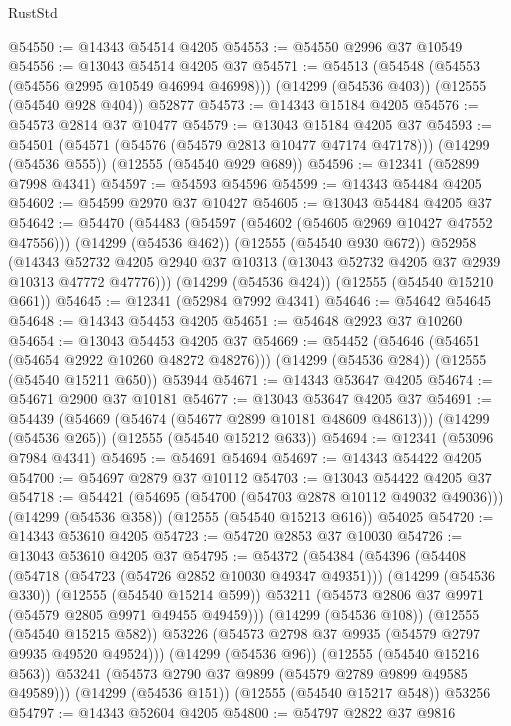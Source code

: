 \begin{lexlean}{RustStd}
\begin{coremodule}
@54550 := @14343 @54514 @4205
@54553 := @54550 @2996 @37 @10549
@54556 := @13043 @54514 @4205 @37
@54571 := @54513
    (@54548 (@54553 (@54556 @2995 @10549 @46994 @46998)))
    (@14299 (@54536 @403))
    (@12555 (@54540 @928 @404))
    @52877
@54573 := @14343 @15184 @4205
@54576 := @54573 @2814 @37 @10477
@54579 := @13043 @15184 @4205 @37
@54593 := @54501
    (@54571 (@54576 (@54579 @2813 @10477 @47174 @47178)))
    (@14299 (@54536 @555))
    (@12555 (@54540 @929 @689))
@54596 := @12341 (@52899 @7998 @4341)
@54597 := @54593 @54596
@54599 := @14343 @54484 @4205
@54602 := @54599 @2970 @37 @10427
@54605 := @13043 @54484 @4205 @37
@54642 := @54470
    (@54483
      (@54597 (@54602 (@54605 @2969 @10427 @47552 @47556)))
      (@14299 (@54536 @462))
      (@12555 (@54540 @930 @672))
      @52958
      (@14343 @52732 @4205 @2940 @37 @10313 (@13043 @52732 @4205 @37 @2939 @10313 @47772 @47776)))
    (@14299 (@54536 @424))
    (@12555 (@54540 @15210 @661))
@54645 := @12341 (@52984 @7992 @4341)
@54646 := @54642 @54645
@54648 := @14343 @54453 @4205
@54651 := @54648 @2923 @37 @10260
@54654 := @13043 @54453 @4205 @37
@54669 := @54452
    (@54646 (@54651 (@54654 @2922 @10260 @48272 @48276)))
    (@14299 (@54536 @284))
    (@12555 (@54540 @15211 @650))
    @53944
@54671 := @14343 @53647 @4205
@54674 := @54671 @2900 @37 @10181
@54677 := @13043 @53647 @4205 @37
@54691 := @54439
    (@54669 (@54674 (@54677 @2899 @10181 @48609 @48613)))
    (@14299 (@54536 @265))
    (@12555 (@54540 @15212 @633))
@54694 := @12341 (@53096 @7984 @4341)
@54695 := @54691 @54694
@54697 := @14343 @54422 @4205
@54700 := @54697 @2879 @37 @10112
@54703 := @13043 @54422 @4205 @37
@54718 := @54421
    (@54695 (@54700 (@54703 @2878 @10112 @49032 @49036)))
    (@14299 (@54536 @358))
    (@12555 (@54540 @15213 @616))
    @54025
@54720 := @14343 @53610 @4205
@54723 := @54720 @2853 @37 @10030
@54726 := @13043 @53610 @4205 @37
@54795 := @54372
    (@54384
      (@54396
        (@54408
          (@54718 (@54723 (@54726 @2852 @10030 @49347 @49351)))
          (@14299 (@54536 @330))
          (@12555 (@54540 @15214 @599))
          @53211
          (@54573 @2806 @37 @9971 (@54579 @2805 @9971 @49455 @49459)))
        (@14299 (@54536 @108))
        (@12555 (@54540 @15215 @582))
        @53226
        (@54573 @2798 @37 @9935 (@54579 @2797 @9935 @49520 @49524)))
      (@14299 (@54536 @96))
      (@12555 (@54540 @15216 @563))
      @53241
      (@54573 @2790 @37 @9899 (@54579 @2789 @9899 @49585 @49589)))
    (@14299 (@54536 @151))
    (@12555 (@54540 @15217 @548))
    @53256
@54797 := @14343 @52604 @4205
@54800 := @54797 @2822 @37 @9816

\end{coremodule}
\end{lexlean}
